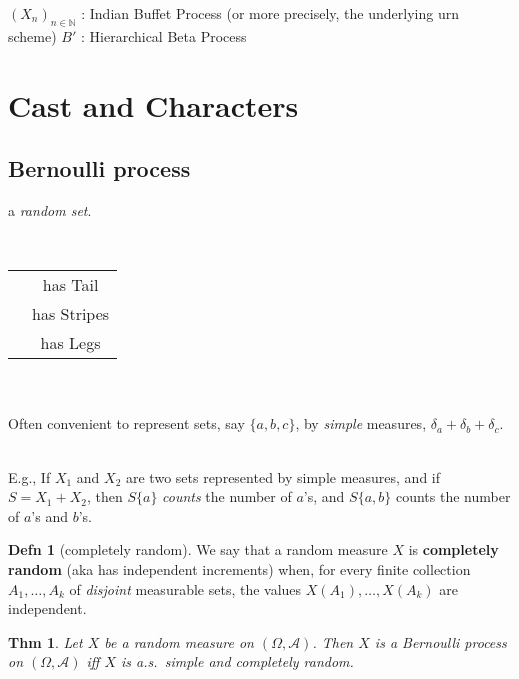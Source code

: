 \documentclass[reqno,oneside,twocolumn,8pt]{amsart}
\newtheorem*{thm}{{\color{BrickRed}Thm}}
\theoremstyle{definition}
\newtheorem*{definition}{{\color{OliveGreen}Defn}}
\theoremstyle{remark}
\newcommand{\defn}[1]{{\bf #1}}
\newcommand{\nprocess}[3]{(#1_{#3})_{#3 \in #2}}
\newcommand{\bspace}{\Omega}
\newcommand{\bsa}{\mathcal A}
\newcommand{\borelspace}{(\bspace,\bsa)}
\newcommand{\Nats}{\mathbb{N}}
\newcommand{\process}[2]{\nprocess #1 #2 n}
\begin{document}
\vspace{1em}

\noindent
$\process X \Nats$ : Indian Buffet Process \citep{GG05,GG06} 
(or more precisely, the underlying urn scheme)\newline
$B'$ : Hierarchical Beta Process \citep{Thibaux2007}\newline

\newpage

\section{Cast and Characters}

\subsection{Bernoulli process} 

a \emph{random set}.

\ \\
\begin{tabular}{cc}
&has Tail \\
&has Stripes \\
&has Legs
\end{tabular}

\ \\

\ \\
\noindent
Often convenient to represent sets, say $\{a,b,c\}$, by \emph{simple} measures, $\delta_a+\delta_b+\delta_c$.  

\ \\
\noindent 
E.g., If $X_1$ and $X_2$ are two sets represented by simple measures, and if $S = X_1+X_2$, then $S\{a\}$ \emph{counts} the number of $a$'s, and $S\{a,b\}$ counts the number of $a$'s and $b$'s.

\begin{definition}[completely random]
We say that a random measure $X$ is \defn{completely random} (aka has independent increments)
when, for every finite collection $A_1,\dotsc, A_k$ of \emph{disjoint} measurable sets, the values $X(A_1), \dotsc, X(A_k)$ are independent.
\end{definition}

\begin{thm}
Let $X$ be a random measure on $\borelspace$.
Then $X$ is a Bernoulli process on $\borelspace$ iff $X$ is a.s.\ simple and completely random.
\end{thm}
\end{document}
